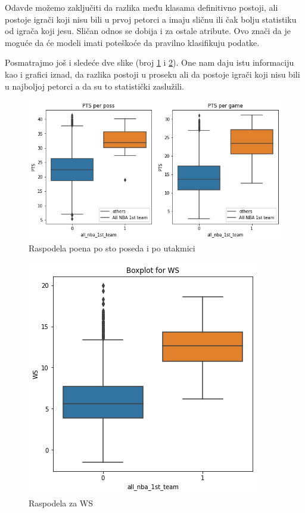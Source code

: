 \documentclass[a4paper]{article}
\begin{document}
Odavde možemo zaključiti da razlika među klasama definitivno postoji, ali
postoje igrači koji nisu bili u prvoj petorci a imaju sličnu ili čak bolju statistiku od igrača koji jesu. Sličan odnos se dobija i za ostale atribute. Ovo znači da je moguće da će modeli imati poteškoće da pravilno klasifikuju podatke. 

Posmatrajmo još i sledeće dve slike (broj \ref{plt:box_plot_pts} i \ref{plt:box_plot_ws}). One nam daju istu informaciju kao i grafici iznad, da razlika postoji u proseku ali da postoje igrači koji nisu bili u najboljoj petorci a da su to statistički zaslužili.

\begin{figure}[h!]
\begin{center}
\includegraphics[scale=0.40]{box_plot_pts.png}
\end{center}
\caption{Raspodela poena po sto poseda i po utakmici}
\label{plt:box_plot_pts}
\end{figure}

\begin{figure}[h!]
\begin{center}
\includegraphics[scale=0.40]{box_plot_ws.png}
\end{center}
\caption{Raspodela za WS}
\label{plt:box_plot_ws}
\end{figure}
\end{document}
